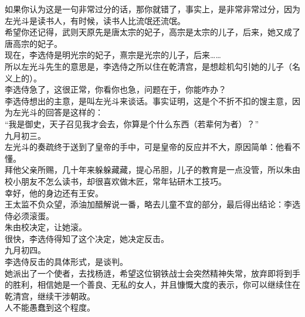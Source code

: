 \begin{multicols}{\theparacolNo}
如果你认为这是一句非常过分的话，那你就错了，事实上，是非常非常过分，因为左光斗是读书人，有时候，读书人比流氓还流氓。\\

希望你还记得，武则天原先是唐太宗的妃子，高宗是太宗的儿子，后来，她又成了唐高宗的妃子。\\

现在，李选侍是明光宗的妃子，熹宗是光宗的儿子，后来……\\

所以左光斗先生的意思是，李选侍之所以住在乾清宫，是想趁机勾引她的儿子（名义上的）。\\

李选侍急了，这很正常，你看你也急，问题在于，你能咋办？\\

李选侍想出的主意，是叫左光斗来谈话。事实证明，这是个不折不扣的馊主意，因为左光斗的回答是这样的：\\

“我是御史，天子召见我才会去，你算是个什么东西（若辈何为者）？”\\

九月初三。\\

左光斗的奏疏终于送到了皇帝的手中，可是皇帝的反应并不大，原因简单：他看不懂。\\

拜他父亲所赐，几十年来躲躲藏藏，提心吊胆，儿子的教育是一点没管，所以朱由校小朋友不怎么读书，却很喜欢做木匠，常年钻研木工技巧。\\

幸好，他的身边还有王安。\\

王太监不负众望，添油加醋解说一番，略去儿童不宜的部分，最后得出结论：李选侍必须滚蛋。\\

朱由校决定，让她滚。\\

很快，李选侍得知了这个决定，她决定反击。\\

九月初四。\\

李选侍反击的具体形式，是谈判。\\

她派出了一个使者，去找杨涟，希望这位钢铁战士会突然精神失常，放弃即将到手的胜利，相信她是一个善良、无私的女人，并且慷慨大度的表示，你可以继续住在乾清宫，继续干涉朝政。\\

人不能愚蠢到这个程度。\\


\end{multicols}
